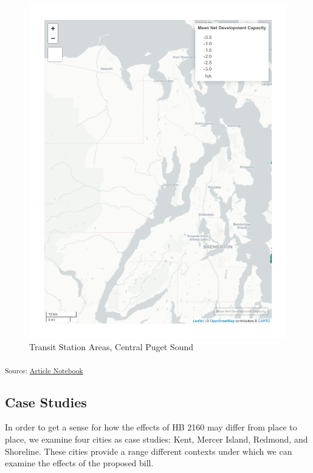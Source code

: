\documentclass[
]{agujournal2019}
\begin{document}
\begin{figure}[H]

{\centering \includegraphics{index_files/figure-pdf/results-puget-sound-station-map-1.pdf}

}

\caption{Transit Station Areas, Central Puget Sound}

\end{figure}%

\textsubscript{Source:
\href{https://tiernanmartin.github.io/2024-transit-oriented-development-bill/index.qmd.html}{Article
Notebook}}

\subsection{Case Studies}\label{case-studies}

In order to get a sense for how the effects of HB 2160 may differ from
place to place, we examine four cities as case studies: Kent, Mercer
Island, Redmond, and Shoreline. These cities provide a range different
contexts under which we can examine the effects of the proposed bill.
\end{document}
